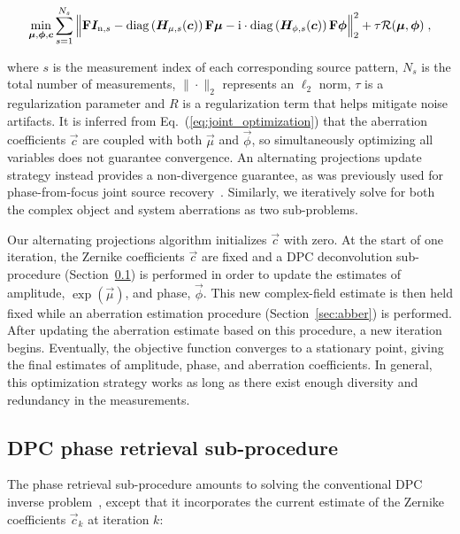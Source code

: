 \begin{equation}
\label{eq:joint_optimization}
\underset{\bm{\mu},\bm{\phi},\bm{c}}{\mathrm{min}} \sum_{s = 1}^{N_{s}} \Big\|\boldsymbol{\mathbf{F}}\bm{I}_{\mathrm{n},s} - \mathrm{diag}\left(\bm{H}_{\mu,s}(\bm{c})\right)\boldsymbol{\mathbf{F}}\bm{\mu} -\mathrm{i}\cdot\mathrm{diag}\left(\bm{H}_{\phi,s}(\bm{c})\right)\boldsymbol{\mathbf{F}}\bm{\phi}\Big\|_{2}^{2} + \tau \mathcal{R}(\bm{\mu},\bm{\phi})\;,
\end{equation}

\noindent where $s$ is the measurement index of each corresponding source pattern, $N_{s}$ is the total number of measurements, $\|\cdot\|_{2}$ represents an $\ell_{2}$ norm, $\tau$ is a regularization parameter and $R$ is a regularization term that helps mitigate noise artifacts. It is inferred from Eq.~(\ref{eq:joint_optimization}) that the aberration coefficients $\vec{c}$ are coupled with both $\vec{\mu}$ and $\vec{\phi}$, so simultaneously optimizing all variables does not guarantee convergence. An alternating projections update strategy instead provides a non-divergence guarantee, as was previously used for phase-from-focus joint source recovery~\cite{zhong2016nonlinear}. Similarly, we iteratively solve for both the complex object and system aberrations as two sub-problems.

Our alternating projections algorithm initializes $\vec{c}$ with zero. At the start of one iteration, the Zernike coefficients $\vec{c}$ are fixed and a DPC deconvolution sub-procedure (Section~\ref{sec:phase}) is performed in order to update the estimates of amplitude, $\exp(\vec{\mu})$, and phase, $\vec{\phi}$. This new complex-field estimate is then held fixed while an aberration estimation procedure (Section~\ref{sec:abber}) is performed. After updating the aberration estimate based on this procedure, a new iteration begins. Eventually, the objective function converges to a stationary point, giving the final estimates of amplitude, phase, and aberration coefficients. In general, this optimization strategy works as long as there exist enough diversity and redundancy in the measurements.

\subsection{DPC phase retrieval sub-procedure}\label{sec:phase}
The phase retrieval sub-procedure amounts to solving the conventional DPC inverse problem~\cite{tian2015quantitative,PhillipsChen17cDPC}, except that it incorporates the current estimate of the Zernike coefficients $\vec{c}_k$ at iteration $k$:

